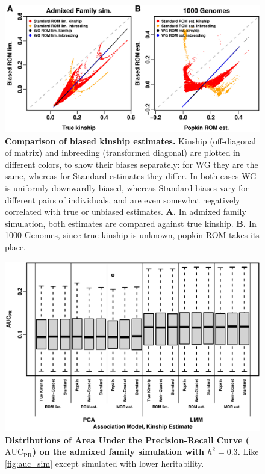 \documentclass[11pt]{article}
\newcommand{\auc}{\text{AUC}_\text{PR}}
\begin{document}
\begin{figure}[hp!]
  \centering
  \includegraphics[width=\textwidth]{kinship-bias.png}
  \caption{
    {\bf Comparison of biased kinship estimates.}
    Kinship (off-diagonal of matrix) and inbreeding (transformed diagonal) are plotted in different colors, to show their biases separately: for WG they are the same, whereas for Standard estimates they differ.
    In both cases WG is uniformly downwardly biased, whereas Standard biases vary for different pairs of individuals, and are even somewhat negatively correlated with true or unbiased estimates.
    \textbf{A.}
    In admixed family simulation, both estimates are compared against true kinship.
    \textbf{B.}
    In 1000 Genomes, since true kinship is unknown, popkin ROM takes its place.
    }
  \label{fig:kinship-bias}
\end{figure}

\begin{figure}[bp!]
  \centering
  \includegraphics[width=\textwidth]{sim-admix-n1000-m100000-k3-f0.3-s0.5-g20/h-0.3/auc.pdf}
  \caption{
    {\bf Distributions of Area Under the Precision-Recall Curve ($\auc$) on the admixed family simulation with $h^2=0.3$.}
    Like \cref{fig:auc_sim} except simulated with lower heritability.
  }
  \label{fig:auc_sim-h3}
\end{figure}
\end{document}
